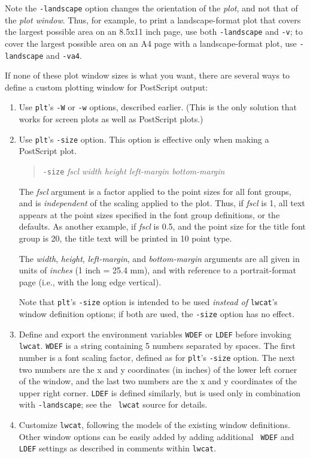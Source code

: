 \documentclass{book}
\begin{document}
Note the {\tt -landscape} option changes the orientation of the {\em
plot}, and not that of the {\em plot window}.  Thus, for example, to
print a landscape-format plot that covers the largest possible area on
an 8.5x11 inch page, use both {\tt -landscape} and {\tt -v};  to cover
the largest possible area on an A4 page with a landscape-format plot,
use {\tt -landscape} and {\tt -va4}.

If none of these plot window sizes is what you want, there are several
ways to define a custom plotting window for PostScript output:

\begin{enumerate}
\item
Use {\tt plt}'s {\tt -W} or {\tt -w} options, described earlier.
(This is the only solution that works for screen plots as well as
PostScript plots.)

\item
{}%
Use {\tt plt}'s {\tt -size} option.  This option is effective only when
making a PostScript plot.

\begin{quote}
{\tt -size} \emph{fscl width height left-margin bottom-margin}
\end{quote}

%
%
%
The {\em fscl} argument is a factor applied to the point sizes for all
font groups, and is {\em independent} of the scaling applied to the plot.
Thus, if {\em fscl} is 1, all text appears at the point sizes specified
in the font group definitions, or the defaults.  As another example, if
{\em fscl} is 0.5, and the point size for the title font group is 20, the
title text will be printed in 10 point type.

The {\em width}, {\em height}, {\em left-margin}, and {\em bottom-margin}
arguments are all given in units of {\em inches} (1 inch = 25.4 mm), and
with reference to a portrait-format page (i.e., with the long edge vertical).

Note that {\tt plt}'s {\tt -size} option is intended to be used {\em instead
of} {\tt lwcat}'s window definition options;  if both are used, the {\tt -size}
option has no effect.

\item
Define and export the environment variables {\tt WDEF} or {\tt LDEF} before
invoking {\tt lwcat}.  {\tt WDEF} is a string containing 5 numbers separated by
spaces.  The first number is a font scaling factor, defined as for {\tt plt}'s
{\tt -size} option.  The next two numbers are the x and y coordinates (in
inches) of the lower left corner of the window, and the last two numbers are
the x and y coordinates of the upper right corner.  {\tt LDEF} is defined
similarly, but is used only in combination with {\tt -landscape}; see the {\tt
lwcat} source for details.

\item
Customize {\tt lwcat}, following the models of the existing window definitions.
Other window options can be easily added by adding additional {\tt
WDEF} and {\tt LDEF} settings as described in comments within {\tt lwcat}.
\end{enumerate}
\end{document}
